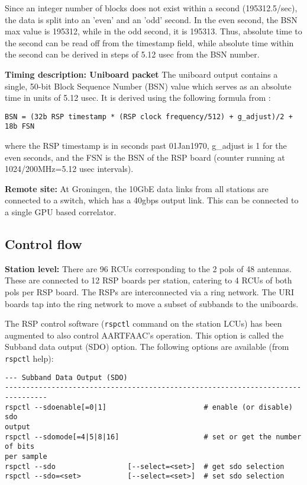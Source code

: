 \documentclass {article}
\begin{document}
Since an integer number of blocks does not exist within a second (195312.5/sec),
the data is  split into an 'even' and  an 'odd' second. In the  even second, the
BSN max  value is 195312, while  in the odd  second, it is 195313. Thus, absolute time to the second can be read off from the timestamp field, while absolute time within the second can be derived in steps of 5.12 usec from the BSN number.

\textbf  {Timing description: Uniboard  packet} The  uniboard output  contains a
single, 50-bit  Block Sequence  Number (BSN) value  which serves as  an absolute
time in units of 5.12 usec. It is derived using the following formula from \cite{RP-1402}:
\begin{lstlisting}
BSN = (32b RSP timestamp * (RSP clock frequency/512) + g_adjust)/2 + 18b FSN
\end{lstlisting}
where the RSP timestamp is in seconds past 01Jan1970, g\_adjust is 1 for the even
seconds,  and  the  FSN  is  the  BSN  of the  RSP  board  (counter  running  at
1024/200MHz=5.12 usec intervals).


\textbf{Remote site:} At  Groningen, the 10GbE data links  from all stations are
connected to a switch, which has a  40gbps output link. This can be connected to
a single GPU based correlator.

\subsection {Control flow}
\textbf {Station  level:} There are  96 RCUs corresponding  to the 2 pols  of 48
antennas. These are  connected to 12 RSP boards per station,  catering to 4 RCUs
of both pols per RSP board.  The RSPs are interconnected via a ring network. The
URI  boards tap  into the  ring network  to  move a  subset of  subbands to  the
uniboards.

The RSP control software (\verb+rspctl+ command  on the station LCUs) has been
augmented  to also  control AARTFAAC's  operation. This  option is  called the
Subband data output  (SDO) option.  The following options  are available (from
\verb+rspctl+ help):
\begin{verbatim}
--- Subband Data Output (SDO)
--------------------------------------------------------------------------------
rspctl --sdoenable[=0|1]                       # enable (or disable) sdo
output
rspctl --sdomode[=4|5|8|16]                    # set or get the number of bits
per sample
rspctl --sdo                 [--select=<set>]  # get sdo selection
rspctl --sdo=<set>           [--select=<set>]  # set sdo selection
\end{verbatim}
\end{document}

